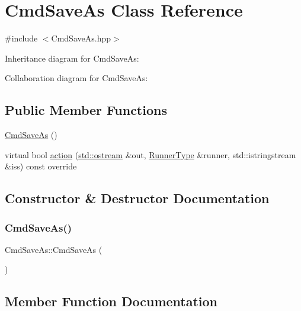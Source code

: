 \hypertarget{classCmdSaveAs}{}\section{Cmd\+Save\+As Class Reference}
\label{classCmdSaveAs}


{\ttfamily \#include $<$Cmd\+Save\+As.\+hpp$>$}



Inheritance diagram for Cmd\+Save\+As\+:


Collaboration diagram for Cmd\+Save\+As\+:
\subsection*{Public Member Functions}
\begin{DoxyCompactItemize}
\item 
\hyperlink{classCmdSaveAs_a8b34fcd8a762a3a6be87dcaee290d304}{Cmd\+Save\+As} ()
\item 
virtual bool \hyperlink{classCmdSaveAs_a12607c0c78b9eec192fa11d6addbb567}{action} (\hyperlink{doctest_8h_a116af65cb5e924b33ad9d9ecd7a783f3}{std\+::ostream} \&out, \hyperlink{Command_8hpp_ad45c3de597c2023a8be0399d914161f4}{Runner\+Type} \&runner, std\+::istringstream \&iss) const override
\end{DoxyCompactItemize}


\subsection{Constructor \& Destructor Documentation}
\mbox{\label{classCmdSaveAs_a8b34fcd8a762a3a6be87dcaee290d304}} 
\subsubsection{\texorpdfstring{Cmd\+Save\+As()}{CmdSaveAs()}}
{\footnotesize\ttfamily Cmd\+Save\+As\+::\+Cmd\+Save\+As (\begin{DoxyParamCaption}{ }\end{DoxyParamCaption})}



\subsection{Member Function Documentation}
\mbox{\label{classCmdSaveAs_a12607c0c78b9eec192fa11d6addbb567}} 
